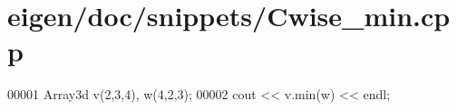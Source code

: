 \hypertarget{eigen_2doc_2snippets_2_cwise__min_8cpp_source}{}\section{eigen/doc/snippets/\+Cwise\+\_\+min.cpp}
\label{eigen_2doc_2snippets_2_cwise__min_8cpp_source}

\begin{DoxyCode}
00001 Array3d v(2,3,4), w(4,2,3);
00002 cout << v.min(w) << endl;
\end{DoxyCode}
